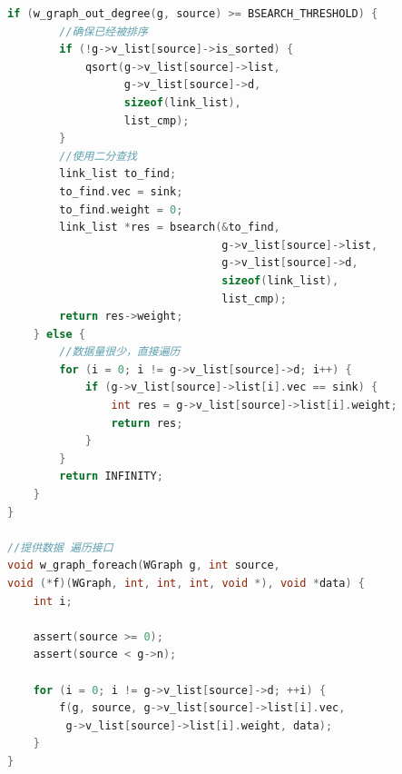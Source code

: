 \documentclass[a4paper,10pt]{ctexart}
\begin{document}
\begin{lstlisting}[language={C}]
    if (w_graph_out_degree(g, source) >= BSEARCH_THRESHOLD) {
        //确保已经被排序
        if (!g->v_list[source]->is_sorted) {
            qsort(g->v_list[source]->list,
                  g->v_list[source]->d,
                  sizeof(link_list),
                  list_cmp);
        }
        //使用二分查找
        link_list to_find;
        to_find.vec = sink;
        to_find.weight = 0;
        link_list *res = bsearch(&to_find,
                                 g->v_list[source]->list,
                                 g->v_list[source]->d,
                                 sizeof(link_list),
                                 list_cmp);
        return res->weight;
    } else {
        //数据量很少，直接遍历
        for (i = 0; i != g->v_list[source]->d; i++) {
            if (g->v_list[source]->list[i].vec == sink) {
                int res = g->v_list[source]->list[i].weight;
                return res;
            }
        }
        return INFINITY;
    }
}

//提供数据 遍历接口
void w_graph_foreach(WGraph g, int source,
void (*f)(WGraph, int, int, int, void *), void *data) {
    int i;

    assert(source >= 0);
    assert(source < g->n);

    for (i = 0; i != g->v_list[source]->d; ++i) {
        f(g, source, g->v_list[source]->list[i].vec,
         g->v_list[source]->list[i].weight, data);
    }
}
\end{lstlisting}
\end{document}
